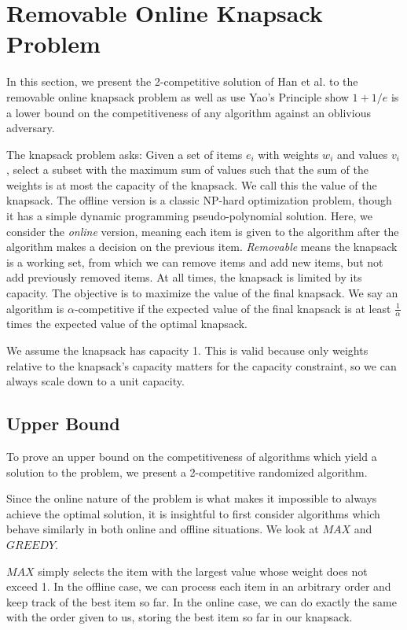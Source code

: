 \section{Removable Online Knapsack Problem}
In this section, we present the 2-competitive solution of Han et al. \cite{han} to the removable online knapsack problem as well as use Yao's Principle show $1+1/e$ is a lower bound on the competitiveness of any algorithm against an oblivious adversary.

The knapsack problem asks: Given a set of items $e_i$ with weights $w_i$ and values $v_i$, select a subset with the maximum sum of values such that the sum of the weights is at most the capacity of the knapsack. We call this the value of the knapsack. The offline version is a classic NP-hard optimization problem, though it has a simple dynamic programming pseudo-polynomial solution. Here, we consider the \emph{online} version, meaning each item is given to the algorithm after the algorithm makes a decision on the previous item. \emph{Removable} means the knapsack is a working set, from which we can remove items and add new items, but not add previously removed items. At all times, the knapsack is limited by its capacity. The objective is to maximize the value of the final knapsack. We say an algorithm is $\alpha$-competitive if the expected value of the final knapsack is at least $\frac{1}{\alpha}$ times the expected value of the optimal knapsack.

We assume the knapsack has capacity 1. This is valid because only weights relative to the knapsack's capacity matters for the capacity constraint, so we can always scale down to a unit capacity.

\subsection{Upper Bound} %
To prove an upper bound on the competitiveness of algorithms which yield a solution to the problem, we present a 2-competitive randomized algorithm.

Since the online nature of the problem is what makes it impossible to always achieve the optimal solution, it is insightful to first consider algorithms which behave similarly in both online and offline situations. We look at $MAX$ and $GREEDY$.

$MAX$ simply selects the item with the largest value whose weight does not exceed 1. In the offline case, we can process each item in an arbitrary order and keep track of the best item so far. In the online case, we can do exactly the same with the order given to us, storing the best item so far in our knapsack.

